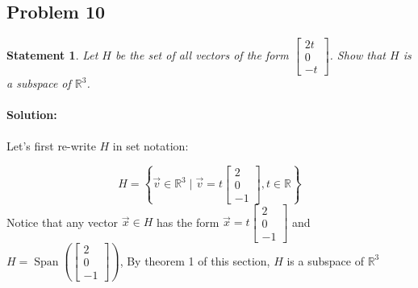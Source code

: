 \documentclass[12pt, letterpaper]{article}
\newcommand{\R}{\mathbb{R}}
\theoremstyle{statement}
\theoremstyle{statement}
\newtheorem*{atmStat}{Statement}
\newenvironment{Solution}{\noindent\ignorespaces\paragraph{Solution:}}{\hfill \ding{122}\par\noindent}
\begin{document}
    \subsection*{Problem 10}
    \begin{atmStat}
    Let $H$ be the set of all vectors of the form $\begin{bmatrix} 2t \\ 0 \\ -t \end{bmatrix}$. Show that $H$ is a subspace of $\R^3$.
    \end{atmStat}
    \begin{Solution}
    Let's first re-write $H$ in set notation:
    
    $$
    H = \left\{ 
    \Vec{v} \in \R^3
    \mid
    \Vec{v} = t\begin{bmatrix} 2 \\ 0 \\ -1 \end{bmatrix}, t\in\R
    \right\}
    $$
    Notice that any vector $\Vec{x}\in H$ has the form $\Vec{x}=t\begin{bmatrix}2\\0\\-1\end{bmatrix}$ and $H=\operatorname{Span}\left(\begin{bmatrix} 2\\0\\-1 \end{bmatrix} \right)$, By theorem 1 of this section, $H$ is a subspace of $\R^3$
    
    \end{Solution}
\end{document}
